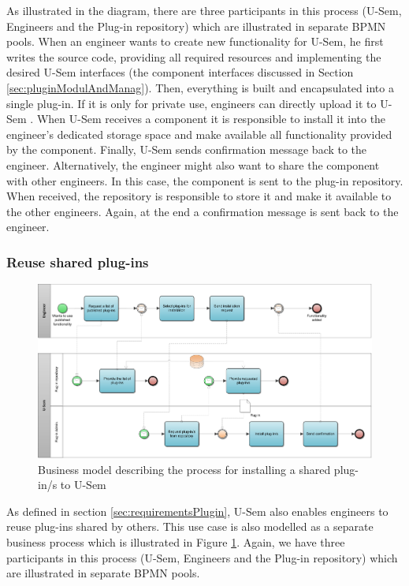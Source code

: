 As illustrated in the diagram, there are three participants in this process (U-Sem, Engineers and the Plug-in repository) which are illustrated in separate BPMN pools. When an engineer wants to create new functionality for U-Sem, he first writes the source code, providing all required resources and implementing the desired U-Sem interfaces (the component interfaces discussed in Section \ref{sec:pluginModulAndManag}). Then, everything is built and encapsulated into a single plug-in. If it is only for private use, engineers can directly upload it to U-Sem . When U-Sem receives a component it is responsible to install it into the engineer's dedicated storage space and make available all functionality provided by the component. Finally, U-Sem sends confirmation message back to the engineer. Alternatively, the engineer might also want to share the component with other engineers. In this case, the component is sent to the plug-in repository. When received, the repository is responsible to store it and make it available to the other engineers. Again, at the end a confirmation message is sent back to the engineer.

\subsubsection{Reuse shared plug-ins}

\begin{figure}[h!]
  \centering
  	\includegraphics[scale=0.75,angle=270]{plug-in/business_processes/InstallPlugInFromRepoBusinessModel.jpg}
  \caption{Business model describing the process for installing a shared plug-in/s to U-Sem}
  \label{fig_repo_bpm}
\end{figure}

As defined in section \ref{sec:requirementsPlugin}, U-Sem also enables engineers to reuse plug-ins shared by others. This use case is also modelled as a separate business process which is illustrated in Figure \ref{fig_repo_bpm}. Again, we have three participants in this process (U-Sem, Engineers and the Plug-in repository) which are illustrated in separate BPMN pools. 

